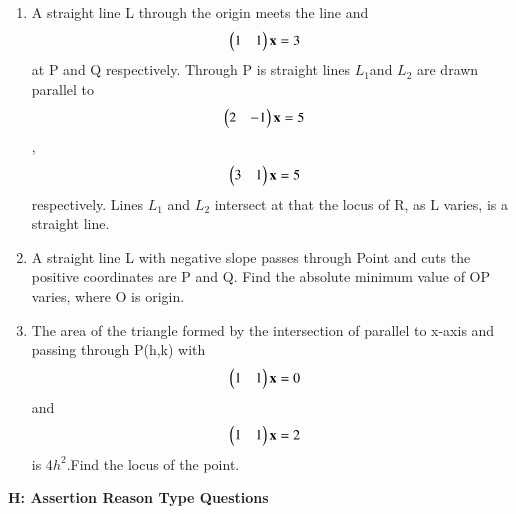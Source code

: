\begin{enumerate}
    \item A straight line L through the origin meets the line and \begin{align}\begin{pmatrix}1 & 1\end{pmatrix} \mathbf {x} &= 3 \end{align} at P and Q respectively. Through P is straight lines $L_1$and $L_2$ are drawn parallel to \begin{align}\begin{pmatrix}2 & -1\end{pmatrix} \mathbf {x} &= 5 \end{align}, \begin{align}\begin{pmatrix}3 & 1\end{pmatrix} \mathbf {x}  &= 5 \end{align} respectively. Lines $L_1$ and $L_2$ intersect at that the locus of R, as L varies, is a straight line.
    \item A straight line L with negative slope passes through Point and cuts the positive coordinates are P and Q. Find the absolute minimum value of OP varies, where O is origin.
    \item The area of the triangle formed by the intersection of parallel to x-axis and passing through P(h,k) with \begin{align}\begin{pmatrix}1 & 1\end{pmatrix} \mathbf {x} &= 0 \end{align}  and \begin{align}\begin{pmatrix}1 & 1\end{pmatrix} \mathbf {x} &= 2 \end{align} is 4$h^2$.Find the locus of the point.
\end{enumerate}
    {\large\textbf{H: Assertion Reason Type Questions}}

